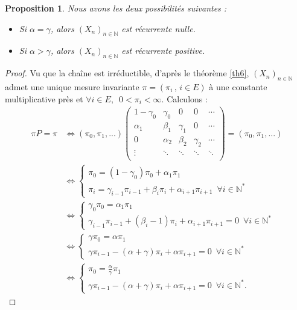 \documentclass[12pt,a4paper]{report}
\newtheorem{prop}[thm]{Proposition}
\theoremstyle{remark}
\begin{document}
\begin{prop}\label{nulle_positive}
Nous avons les deux possibilités suivantes :
\begin{itemize}
    \item  Si $\alpha = \gamma$, alors $(X_n)_{n \in \mathbb{N}}$ est récurrente nulle.
    \item Si $\alpha > \gamma$, alors $(X_n)_{n \in \mathbb{N}}$ est récurrente positive.
\end{itemize}
\end{prop}
\begin{proof}
Vu que la chaîne est irréductible, d'après le théorème \ref{th6}, $(X_n)_{n\in\mathbb{N}}$ admet une unique mesure invariante $\pi=(\pi_i\, , \, i \in E)$ à une constante multiplicative près et $\forall i \in E, \, \, \, 0< \pi_i<\infty$. Calculons :
\begin{align*}
\pi P=\pi
&\iff (\pi_0,\pi_1,...) \begin{pmatrix}
        1-\gamma_0 & \gamma_0 & 0 & 0 & \cdots \\ 
         \alpha_1 & \beta_1 & \gamma_1 & 0 & \cdots\\
         0 & \alpha_2 & \beta_2 & \gamma_2 & \cdots\\
        \vdots &\ddots & \ddots & \ddots & \ddots \\ 
\end{pmatrix} = (\pi_0,\pi_1,...)\\
&\iff 
\left\{
\begin{array}{ll}
        \pi_0=(1-\gamma_0)\pi_0+\alpha_1\pi_1 \\
        \pi_i=\gamma_{i-1}\pi_{i-1}+\beta_{i}\pi_{i}+\alpha_{i+1}\pi_{i+1} \, \, \, \forall i \in \mathbb{N}^*
    \end{array}
\right. \\
&\iff \left\{
\begin{array}{ll}
         \gamma_0\pi_0=\alpha_1\pi_1 \\
        \gamma_{i-1}\pi_{i-1}+(\beta_{i}-1)\pi_{i}+\alpha_{i+1}\pi_{i+1} = 0 \, \, \, \forall i \in \mathbb{N}^*
    \end{array}
\right. \\
&\iff \left\{
\begin{array}{ll}
         \gamma\pi_0=\alpha\pi_1 \\
        \gamma\pi_{i-1}-(\alpha+\gamma)\pi_{i}+\alpha\pi_{i+1} = 0 \, \, \, \forall i \in \mathbb{N}^*
    \end{array}
\right. \\
&\iff \left\{
\begin{array}{ll}
         \pi_0=\frac{\alpha}{\gamma}\pi_1 \\
        \gamma\pi_{i-1}-(\alpha+\gamma)\pi_{i}+\alpha\pi_{i+1} = 0 \, \, \, \forall i \in \mathbb{N}^*.
    \end{array}
\right.
\end{align*}


\end{proof}
\end{document}
